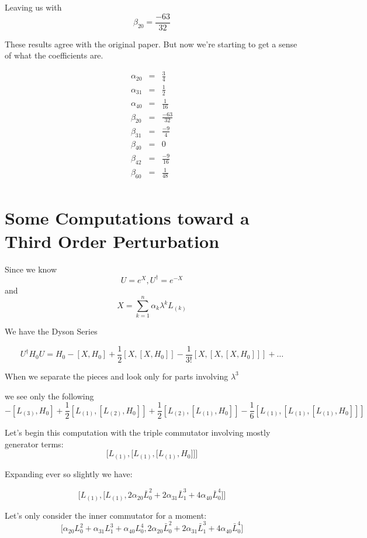 \documentclass{article}
\newcommand{\lrbrack}[2]{\lbrack #1 , #2 \rbrack}
\begin{document}
Leaving us with 
\[
\beta_{20} = \frac{-63}{32}
\]


These results agree with the original paper.  But now we're starting to get a sense of what the coefficients are.


\begin{eqnarray*}
\alpha_{20} & = & \frac{3}{4}\\
\alpha_{31} & = & \frac{1}{2}\\
\alpha_{40} & = & \frac{1}{16}\\
\beta_{20} & = & \frac{-63}{32}\\
\beta_{31} & = & \frac{-9}{4}\\
\beta_{40} & = & 0\\
\beta_{42} & = & \frac{-9}{16}\\
\beta_{60} & = & \frac{1}{48}\\
\end{eqnarray*}




\section*{Some Computations toward a Third Order Perturbation}

Since we know
\[
U = e^X, U^{\dagger} = e^{-X}
\]
and 
\[
X = \sum_{k=1}^n \alpha_k \lambda^k L_{(k)}
\]

We have the Dyson Series

\[
U^{\dagger}H_0 U = H_0 - [X,H_0] + \frac{1}{2}[X,[X,H_0]] - \frac{1}{3!}[X,[X,[X,H_0]]] + \dots
\]

When we separate the pieces and look only for parts involving $\lambda^3$

we see only the following
\[
-[L_{(3)},H_0] + \frac{1}{2} [L_{(1)},[L_{(2)}, H_0]] + \frac{1}{2}[L_{(2)},[L_{(1)},H_0]] - \frac{1}{6}[L_{(1)},[L_{(1)},[L_{(1)},H_0]]]
\]

Let's begin this computation with the triple commutator involving mostly generator terms:
\[
\lbrack L_{(1)} , \lbrack L_{(1)} ,\lbrack L_{(1)} , H_0 \rbrack\rbrack\rbrack
\]

Expanding ever so slightly we have:

\[
\lbrack L_{(1)} , \lbrack L_{(1)} , 2\alpha_{20} \bar{L}_0^2 + 2 \alpha_{31} \bar{L}_1^3 + 4 \alpha_{40} \bar{L}_0^4 \rbrack\rbrack
\]


Let's only consider the inner commutator for a moment:
\[
\lrbrack{\alpha_{20}L_0^2 + \alpha_{31}L_1^3 + \alpha_{40}L_0^4}{2\alpha_{20} \bar{L}_0^2 + 2 \alpha_{31} \bar{L}_1^3 + 4 \alpha_{40} \bar{L}_0^4}
\]
\end{document}
